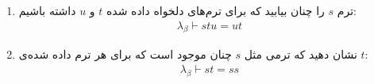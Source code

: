 \begin{enumerate}[label=(\alph*)]
    \item ترم $s$ را چنان بیابید که برای ترم‌های دلخواه داده شده $t$ و $u$ داشته باشیم:
        \begin{gather*}
            \lambda_\beta \vdash stu = ut
        \end{gather*}
    \item نشان دهید که ترمی مثل $s$ چنان موجود است که برای هر ترم داده شده‌ی $t$:
        \begin{gather*}
            \lambda_\beta \vdash st = ss
        \end{gather*}
\end{enumerate}